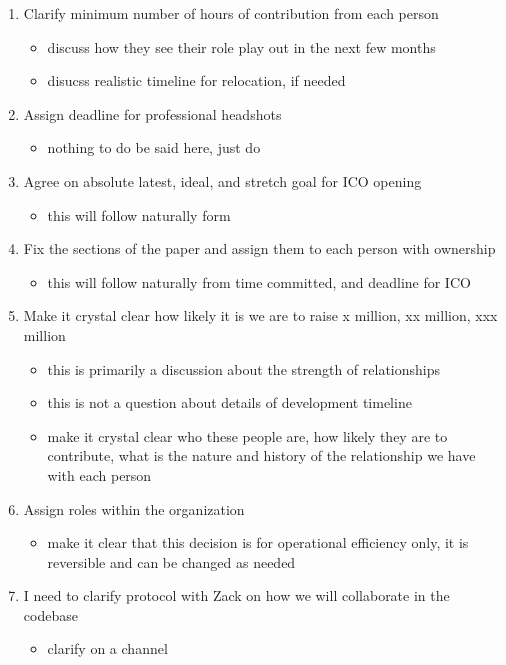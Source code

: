\begin{enumerate}
\begin{itemize}
		\end{itemize}
	\item Clarify minimum number of hours of contribution from each person
		\begin{itemize}
			\item discuss how they see their role play out in the next few months
			\item disucss realistic timeline for relocation, if needed
		\end{itemize}
	\item Assign deadline for professional headshots
		\begin{itemize}
			\item nothing to do be said here, just do
		\end{itemize}
	\item Agree on absolute latest, ideal, and stretch goal for ICO opening
		\begin{itemize}
			\item this will follow naturally form 
		\end{itemize}
	\item Fix the sections of the paper and assign them to each person with ownership
		\begin{itemize}
			\item this will follow naturally from time committed, and deadline for ICO
		\end{itemize}
	\item Make it crystal clear how likely it is we are to raise x million, xx million, xxx million
		\begin{itemize}
			\item this is primarily a discussion about the strength of relationships
			\item this is not a question about details of development timeline
			\item make it crystal clear who these people are, how likely they are to contribute, what is the nature and history of the relationship we have with each person
		\end{itemize}
	\item Assign roles within the organization
		\begin{itemize}
			\item make it clear that this decision is for operational efficiency only, it is reversible and can be changed as needed
		\end{itemize}
	\item I need to clarify protocol with Zack on how we will collaborate in the codebase
		\begin{itemize}
			\item clarify on a channel
		\end{itemize}
\end{enumerate}




